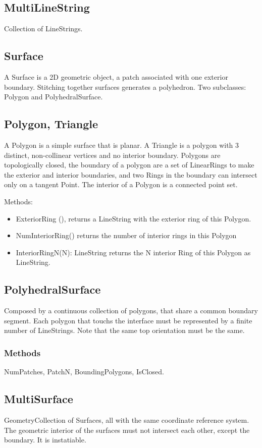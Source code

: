 \documentclass[11pt]{article}
\begin{document}
\subsection{MultiLineString}
Collection of LineStrings.

\subsection{Surface}
A Surface is a 2D geometric object, a patch associated with one exterior boundary. Stitching together surfaces generates a polyhedron. Two subclasses: Polygon and PolyhedralSurface. 
\subsection{Polygon, Triangle}
A Polygon is a simple surface that is planar. A Triangle is a polygon with 3 distinct, non-collinear vertices and no interior boundary. Polygons are topologically closed, the boundary of a polygon are a set of LinearRings to make the exterior and interior boundaries, and two Rings in the boundary can intersect only on a tangent Point. The interior of a Polygon is a connected point set. 

Methods: 
\begin{itemize}
\item ExteriorRing (), returns a LineString with the exterior ring of this Polygon.
\item NumInteriorRing() returns the number of interior rings in this Polygon
\item InteriorRingN(N): LineString returns the N interior Ring of this Polygon as LineString.
\end{itemize}

\subsection{PolyhedralSurface}
Composed by a continuous collection of polygons, that share a common boundary segment. Each polygon that touchs the interface must be represented by a finite number of LineStrings. Note that the same top orientation must be the same. 
\subsubsection{Methods}
NumPatches, PatchN, BoundingPolygons, IsClosed.

\subsection{MultiSurface}
GeometryCollection of Surfaces, all with the same coordinate reference system. The geometric interior of the surfaces must not intersect each other, except the boundary.  It is instatiable. 
\end{document}
